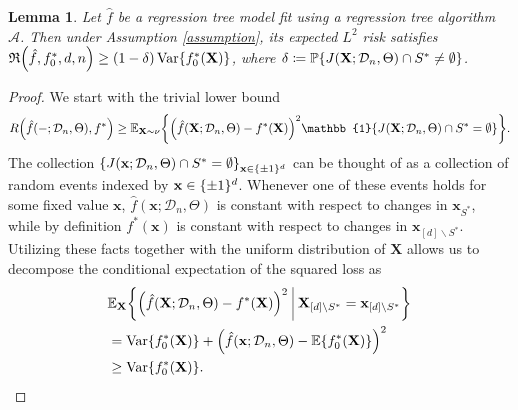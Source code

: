 \documentclass[11pt]{article}
\newtheorem{lemma}[theorem]{Lemma}
\newcommand{\bx}{\mathbf{x}}
\newcommand{\bX}{\mathbf{X}}
\DeclarePairedDelimiter{\braces}{\lbrace}{\rbrace}
\DeclarePairedDelimiter{\paren}{(}{)}
\renewcommand{\P}{\mathbb{P}}
\newcommand{\E}{\mathbb{E}}
\newcommand{\indicator}{\mathbb{1}}
\newcommand{\Var}{\operatorname{Var}}
\newcommand{\binspace}{\braces{\pm 1}^\nfeats}
\newcommand{\xmeasure}{\nu}
\newcommand{\nfeats}{d}
\newcommand{\nsamples}{n}
\newcommand{\coordindices}{[\nfeats]}
\newcommand{\data}[1][n]{\mathcal{D}_{#1}}
\newcommand{\suppset}{S^*}
\newcommand{\alg}{\mathcal{A}}
\newcommand{\objective}{\mathfrak{R}}
\begin{document}
\begin{lemma}
\label{lem:covariate_selection_tree}
    Let $\hat f$ be a regression tree model fit using a regression tree algorithm $\alg$.
    Then under Assumption \ref{assumption}, its expected $L^2$ risk satisfies $\objective\paren*{\hat f, f^*_0,\nfeats,\nsamples} \geq (1-\delta)\Var\braces*{f^*_0(\bX)}$, where $\delta \coloneqq \P\braces*{J(\bX;\data,\Theta)\cap \suppset \neq \emptyset }$.
\end{lemma}

\begin{proof}
    We start with the trivial lower bound
    \begin{equation} \label{eq:query_path_helper1}
        R\paren*{\hat f(-;\data,\Theta),f^*} \geq \E_{\bX\sim\xmeasure}\braces*{\paren*{\hat f(\bX;\data,\Theta) - f^*(\bX)}^2\indicator\braces*{J(\bX;\data,\Theta)\cap \suppset = \emptyset }}.
    \end{equation}
    The collection $\braces*{J(\bx;\data,\Theta)\cap \suppset = \emptyset }_{\bx \in \binspace}$ can be thought of as a collection of random events indexed by $\bx \in \binspace$.
    Whenever one of these events holds for some fixed value $\bx$, $\hat f(\bx;\data,\Theta)$ is constant with respect to changes in $\bx_{\suppset}$, while by definition $f^*(\bx)$ is constant with respect to changes in $\bx_{\coordindices\backslash\suppset}$.
    Utilizing these facts together with the uniform distribution of $\bX$ allows us to decompose the conditional expectation of the squared loss as
    \begin{equation} \label{eq:query_path_helper2}
    \begin{split}
        & \E_{\bX}\braces*{\paren*{\hat f(\bX;\data,\Theta) - f^*(\bX)}^2~
            \vline~\bX_{\coordindices\backslash\suppset} = \bx_{\coordindices\backslash\suppset}} \\
            &= \Var\braces*{f_0^*(\bX)} + \paren*{\hat f(\bx;\data,\Theta) - \E\braces*{f_0^*(\bX)}}^2 \\
            &\geq \Var\braces*{f_0^*(\bX)}.
    \end{split}
    \end{equation}

\end{proof}
\end{document}
